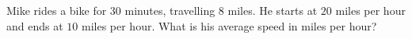 Mike rides a bike for $30$ minutes, travelling $8$ miles. He starts at $20$ miles per hour and ends at $10$ miles per hour. What is his average speed in miles per hour?
